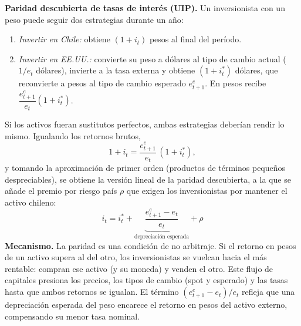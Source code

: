 \documentclass[a4paper]{article}
\begin{document}
\medskip
\noindent\textbf{Paridad descubierta de tasas de inter\'es (UIP).} Un inversionista con un peso puede seguir dos estrategias durante un a\~no:
\begin{enumerate}
    \item \emph{Invertir en Chile:} obtiene \( (1+i_t) \) pesos al final del per\'iodo.
    \item \emph{Invertir en EE.UU.:} convierte su peso a d\'olares al tipo de cambio actual (\(1/e_t\) d\'olares), invierte a la tasa externa y obtiene \( (1+i_t^*) \) d\'olares, que reconvierte a pesos al tipo de cambio esperado \( e_{t+1}^e \). En pesos recibe \( \dfrac{e_{t+1}^e}{e_t}(1+i_t^*) \).
\end{enumerate}
Si los activos fueran sustitutos perfectos, ambas estrategias deber\'ian rendir lo mismo. Igualando los retornos brutos,
\[
1 + i_t = \frac{e_{t+1}^e}{e_t}\,(1 + i_t^*),
\]
y tomando la aproximaci\'on de primer orden (productos de t\'erminos peque\~nos despreciables), se obtiene la versi\'on lineal de la paridad descubierta, a la que se a\~nade el premio por riesgo pa\'is \(\rho\) que exigen los inversionistas por mantener el activo chileno:
\[
\;i_t = i_t^* + \underbrace{\frac{e_{t+1}^e - e_t}{e_t}}_{\text{depreciaci\'on esperada}} + \rho\;
\]
\textbf{Mecanismo.} La paridad es una condici\'on de no arbitraje. Si el retorno en pesos de un activo supera al del otro, los inversionistas se vuelcan hacia el m\'as rentable: compran ese activo (y su moneda) y venden el otro. Este flujo de capitales presiona los precios, los tipos de cambio (spot y esperado) y las tasas hasta que ambos retornos se igualan. El t\'ermino \( (e_{t+1}^e - e_t)/e_t \) refleja que una depreciaci\'on esperada del peso encarece el retorno en pesos del activo externo, compensando su menor tasa nominal.
\end{document}
